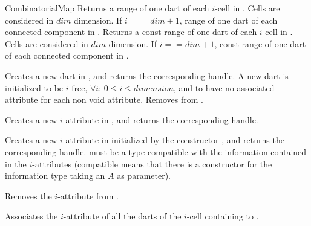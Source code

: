 \begin{ccRefConcept}{CombinatorialMap}
    {Returns a range of one dart of each $i$-cell in .
     Cells are considered in $dim$ dimension. If $i==dim+1$,  
     range of one dart of each connected component in .
  }
\ccGlue
{}
    {Returns a const range of one dart of each $i$-cell in .
     Cells are considered in $dim$ dimension. If $i==dim+1$,  
     const range of one dart of each connected component in .
   }

   {Creates a new dart in , and returns the corresponding handle.
    A new dart is initialized to be $i$-free,
    $\forall i$: $0 \leq i \leq dimension$, and to have no associated 
    attribute for each non void attribute.
  }
   {Removes  from .}

{Creates a new $i$-attribute in , and returns the corresponding handle.
  }

{Creates a new $i$-attribute in  initialized 
  by the constructor , and returns the corresponding handle.  must be 
  a type compatible with the information contained in the $i$-attributes 
  (compatible means that there is a constructor for the information type 
  taking an $A$ as parameter).
  }

{Removes the $i$-attribute  from .
  }

   {Associates the $i$-attribute of all the darts of the $i$-cell 
     containing  to .
  }


\end{ccRefConcept}
